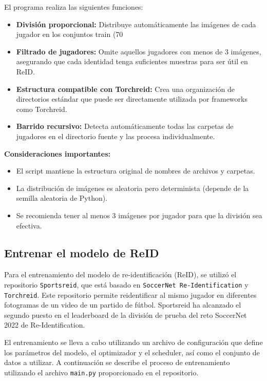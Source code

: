 \documentclass[12pt, a4paper, twoside]{article}
\begin{document}
	El programa realiza las siguientes funciones:
	
	\begin{itemize}
		\item \textbf{División proporcional:} Distribuye automáticamente las imágenes de cada jugador en los conjuntos train (70%
		\item \textbf{Filtrado de jugadores:} Omite aquellos jugadores con menos de 3 imágenes, asegurando que cada identidad tenga suficientes muestras para ser útil en ReID.
		\item \textbf{Estructura compatible con Torchreid:} Crea una organización de directorios estándar que puede ser directamente utilizada por frameworks como Torchreid.
		\item \textbf{Barrido recursivo:} Detecta automáticamente todas las carpetas de jugadores en el directorio fuente y las procesa individualmente.
	\end{itemize}
	
	\textbf{Consideraciones importantes:}
	\begin{itemize}
		\item El script mantiene la estructura original de nombres de archivos y carpetas.
		\item La distribución de imágenes es aleatoria pero determinista (depende de la semilla aleatoria de Python).
		\item Se recomienda tener al menos 3 imágenes por jugador para que la división sea efectiva.
	\end{itemize}
	
	\subsection{Entrenar el modelo de ReID}
	
	Para el entrenamiento del modelo de re-identificación (ReID), se utilizó el repositorio \texttt{Sportsreid}, que está basado en \texttt{SoccerNet Re-Identification} y \texttt{Torchreid}. Este repositorio permite reidentificar al mismo jugador en diferentes fotogramas de un video de un partido de fútbol. Sportsreid ha alcanzado el segundo puesto en el leaderboard de la división de prueba del reto SoccerNet 2022 de Re-Identification.
	
	El entrenamiento se lleva a cabo utilizando un archivo de configuración que define los parámetros del modelo, el optimizador y el scheduler, así como el conjunto de datos a utilizar. A continuación se describe el proceso de entrenamiento utilizando el archivo \texttt{main.py} proporcionado en el repositorio.
	
\end{document}
